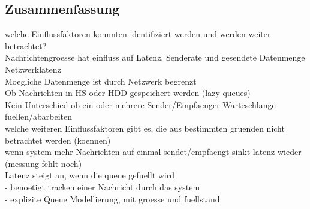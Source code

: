 \subsection{Zusammenfassung}
\label{sec:rmqZusammenfassung}
welche Einflussfaktoren konnnten identifiziert werden und werden weiter betrachtet? \\
Nachrichtengroesse hat einfluss auf Latenz, Senderate und gesendete Datenmenge \\
Netzwerklatenz \\
Moegliche Datenmenge ist durch Netzwerk begrenzt\\
Ob Nachrichten in HS oder HDD gespeichert werden (lazy queues) \\
Kein Unterschied ob ein oder mehrere Sender/Empfaenger Warteschlange fuellen/abarbeiten \\

welche weiteren Einflussfaktoren gibt es, die aus bestimmten gruenden nicht betrachtet werden (koennen)\\
wenn system mehr Nachrichten auf einmal sendet/empfaengt sinkt latenz wieder (messung fehlt noch)\\
Latenz steigt an, wenn die queue gefuellt wird \\
- benoetigt tracken einer Nachricht durch das system \\
- explizite Queue Modellierung, mit groesse und fuellstand \\




